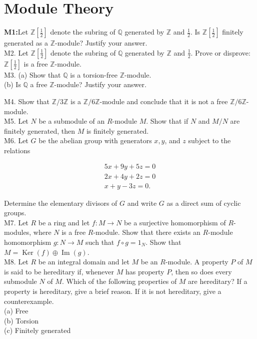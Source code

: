 \chapter{Module Theory}
\textbf{M1:}Let $\mathbb{Z}\left[\frac{1}{2}\right]$ denote the subring of $\mathbb{Q}$ generated by $\mathbb{Z}$ and $\frac{1}{2}$. Is $\mathbb{Z}\left[\frac{1}{2}\right]$ finitely generated as a $\mathbb{Z}$-module? Justify your answer.\\
M2. Let $\mathbb{Z}\left[\frac{1}{2}\right]$ denote the subring of $\mathbb{Q}$ generated by $\mathbb{Z}$ and $\frac{1}{2}$. Prove or disprove: $\mathbb{Z}\left[\frac{1}{2}\right]$ is a free $\mathbb{Z}$-module.\\
M3. (a) Show that $\mathbb{Q}$ is a torsion-free $\mathbb{Z}$-module.\\
(b) Is $\mathbb{Q}$ a free $\mathbb{Z}$-module? Justify your answer.

M4. Show that $\mathbb{Z} / 3 \mathbb{Z}$ is a $\mathbb{Z} / 6 \mathbb{Z}$-module and conclude that it is not a free $\mathbb{Z} / 6 \mathbb{Z}$-module.\\
M5. Let $N$ be a submodule of an $R$-module $M$. Show that if $N$ and $M / N$ are finitely generated, then $M$ is finitely generated.\\
M6. Let $G$ be the abelian group with generators $x, y$, and $z$ subject to the relations

$$
\begin{array}{r}
	5 x+9 y+5 z=0 \\
	2 x+4 y+2 z=0 \\
	x+y-3 z=0 .
\end{array}
$$

Determine the elementary divisors of $G$ and write $G$ as a direct sum of cyclic groups.\\
M7. Let $R$ be a ring and let $f: M \rightarrow N$ be a surjective homomorphism of $R$-modules, where $N$ is a free $R$-module. Show that there exists an $R$-module homomorphism $g: N \rightarrow M$ such that $f \circ g=1_{N}$. Show that $M=\operatorname{Ker}(f) \oplus \operatorname{Im}(g)$.\\
M8. Let $R$ be an integral domain and let $M$ be an $R$-module. A property $P$ of $M$ is said to be hereditary if, whenever $M$ has property $P$, then so does every submodule $N$ of $M$. Which of the following properties of $M$ are hereditary? If a property is hereditary, give a brief reason. If it is not hereditary, give a counterexample.\\
(a) Free\\
(b) Torsion\\
(c) Finitely generated

